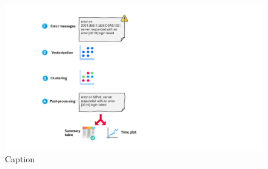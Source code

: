 
\begin{figure}
    \centering
    \includegraphics[width=.5\textwidth]{figures/410_method/pipeline.pdf}
    \caption{Caption}
    \label{fig:my_label}
\end{figure}




